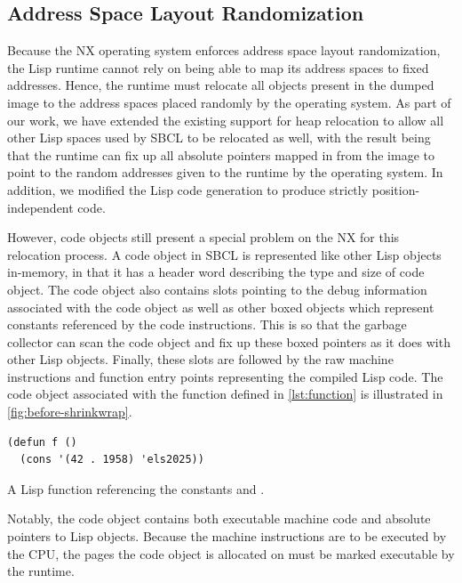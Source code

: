 \documentclass[format=sigconf]{acmart}
\begin{document}
\subsection{Address Space Layout Randomization}
Because the NX operating system enforces address space layout randomization, the Lisp runtime cannot rely on being able to map its address spaces to fixed addresses. Hence, the runtime must relocate all objects present in the dumped image to the address spaces placed randomly by the operating system. As part of our work, we have extended the existing support for heap relocation to allow all other Lisp spaces used by SBCL to be relocated as well, with the result being that the runtime can fix up all absolute pointers mapped in from the image to point to the random addresses given to the runtime by the operating system. In addition, we modified the Lisp code generation to produce strictly position-independent code.

However, code objects still present a special problem on the NX for this relocation process. A code object in SBCL is represented like other Lisp objects in-memory, in that it has a header word describing the type and size of code object. The code object also contains slots pointing to the debug information associated with the code object as well as other boxed objects which represent constants referenced by the code instructions. This is so that the garbage collector can scan the code object and fix up these boxed pointers as it does with other Lisp objects. Finally, these slots are followed by the raw machine instructions and function entry points representing the compiled Lisp code. The code object associated with the function defined in \autoref{lst:function} is illustrated in \autoref{fig:before-shrinkwrap}.

\begin{listing}[h]
\begin{verbatim}
(defun f ()
  (cons '(42 . 1958) 'els2025))

\end{verbatim}
\caption{A Lisp function referencing the constants  and .}
\label{lst:function}
\end{listing}

Notably, the code object contains both executable machine code and absolute pointers to Lisp objects. Because the machine instructions are to be executed by the CPU, the pages the code object is allocated on must be marked executable by the runtime.
\end{document}
